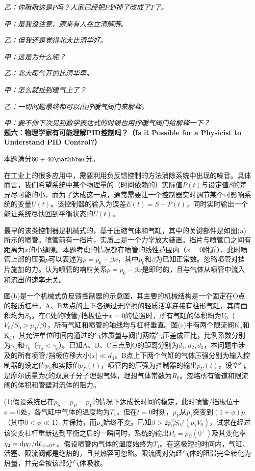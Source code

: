 \documentclass[11pt,a4paper,onecolumn,UTF8]{ctexart}
\begin{document}
	\textit{乙：你瞅瞅这是$P$吗？人家已经把$P$划掉了改成了$T$了。}
	
	\textit{甲：是我没注意，原来有人在立清解燕。}
	
	\textit{乙：但我还是觉得北大比清华好。}
	
	\textit{甲：这是为什么呢？}
	
	\textit{乙：北大暖气开的比清华早。}
	
	\textit{甲：怎么就扯到暖气上了？}
	
	\textit{乙：一切问题最终都可以由拧暖气阀门来解释。}
	
	\textit{甲：要不你下次见到数学表达式的时候也用拧暖气阀门给解释一下？}\\
	
	\noindent
	\textbf{题六：物理学家有可能理解PID控制吗？（Is it Possible for a Physicist to Understand PID Control?）}
	
	本题满分$60+40\ui$分。
	
	在工业上的很多应用中，需要利用负反馈控制的方法消除系统中出现的噪音。具体而言，我们希望系统中某个物理量的（时间依赖的）实际值$P(t)$与设定值$S$的差异尽可能的小，而为了达成这一点，通常需要让一个控制器实时调节某个可影响系统的变量$U(t)$。该控制器的输入为误差$E(t)=S-P(t)$，同时实时输出一个能让系统尽快回到平衡状态的$U(t)$。
	
	最早的该类控制器是机械式的，基于压缩气体和气缸，其中的关键部件是如图(a)所示的喷管。喷管前有一挡片，实质上是一个力学放大装置。挡片与喷管口之间有距离为$x$的小缝隙。本题考虑的情况都在喷管的线性范围内（$x=0$附近），此时喷管上部的压强$p$可以表述为$p=p_0-\beta x$，其中$p_0$和$\beta$为已知正常数。忽略喷管对挡片施加的力。认为喷管的响应关系$p=p_0-\beta x$是即时的，且与气体从喷管中流入和流出的速率无关。
	
	图(b)是一个机械式负反馈控制器的示意图，其主要的机械结构是一个固定在O点的轻质杠杆。A、B两点的上下各通过无摩擦的轻质活塞连接有柱形气缸，其底面积均为$S_0$。在C处的喷管/挡板位于$x=0$的位置时，所有气缸的体积均为$V_0$（$V_0/S_0>p_0/\beta$），所有气缸和喷管的轴线均与杠杆垂直。图(c)中有两个限流阀K$_a$和K$_b$，其允许单位时间内通过的气体质量与阀门两端气压差成正比，比例系数分别为$\gamma_a$和$\gamma_b$（$\gamma_a<\gamma_b$）。已知A、B、C三点到O的距离分别为$d_1,d_2,d_3$，本问题中涉及的所有喷管/挡板位移大小$|x|\ll d_3$。B点上下两个气缸的气体压强分别为输入控制器的设定值$p_S$和实际值$p_P(t)$，喷管内的压强为控制器的输出$p_U(t)$。设空气是摩尔质量为$\xi$的双原子分子理想气体，理想气体常数为$R_0$。忽略所有管道和限流阀的体积和管壁对流体的阻力。
	
	(1)假设系统已在$p_S=p_P=p_1$的情况下达成长时间的稳定，此时喷管/挡板位于$x=0$处，各气缸中气体的温度均为$T_1$。但在$t=0$时刻，$p_P$从$p_1$突变到$(1+\phi)p_1$（其中$0<\phi\ll 1$）并保持，而$p_S$始终不变。已知$\beta>2p_0^2S_0/(p_1V_0)$，试求在经过该突变杠杆重新达到平衡之后的一瞬间时，系统的输出$P_2=p_U(0^+)$及其变化率$\eta_2=\mathrm{d} p_U/\mathrm{d} t|_{t=0^+}$。假设喷管内气体的温度始终为$T_1$。在这极短的时间内，气缸、活塞、限流阀都是绝热的，且其热容可忽略。限流阀对流经气体的阻滞完全转化为热量，并完全被该部分气体吸收。
	
\end{document}
